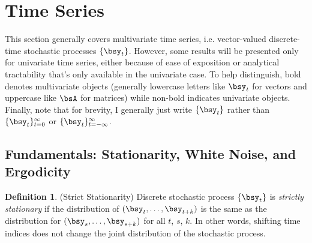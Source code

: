 \documentclass[12pt]{article}
\theoremstyle{plain}
\theoremstyle{definition}
\newtheorem{defn}[thm]{Definition}
\theoremstyle{remark}
\newcommand{\tinfz}{_{t=0}^\infty}
\begin{document}






\clearpage
\section{Time Series}

This section generally covers multivariate time series, i.e.
vector-valued discrete-time stochastic processes $\{\bsy_t\}$.
However, some results will be presented only for univariate time series,
either because of ease of exposition or analytical tractability that's
only available in the univariate case. To help distinguish, bold denotes
multivariate objects (generally lowercase letters like $\bsy_t$ for
vectors and uppercase like $\bsA$ for matrices) while non-bold indicates
univariate objects. Finally, note that for brevity, I generally just
write $\{\bsy_t\}$ rather than $\{\bsy_t\}\tinfz$ or
$\{\bsy_t\}_{t=-\infty}^{\infty}$.




\subsection{Fundamentals: Stationarity, White Noise, and Ergodicity}

\begin{defn}(Strict Stationarity)
Discrete stochastic process $\{\bsy_t\}$ is \emph{strictly stationary} if
the distribution of $(\bsy_t,\ldots,\bsy_{t+k})$ is the same as the
distribution for $(\bsy_s,\ldots,\bsy_{s+k})$ for all $t$, $s$, $k$.
In other words, shifting time indices does not change the joint
distribution of the stochastic process.
\end{defn}
\end{document}
